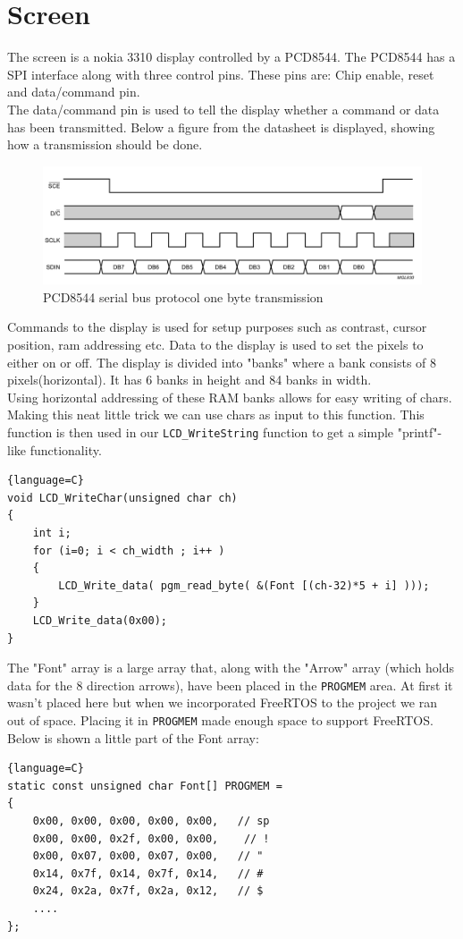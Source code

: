 \section{Screen}
The screen is a nokia 3310 display controlled by a PCD8544. The PCD8544 has a SPI interface along with three control pins. These pins are: Chip enable, reset and data/command pin.\\
The data/command pin is used to tell the display whether a command or data has been transmitted. Below a figure from the datasheet is displayed, showing how a transmission should be done.

\begin{figure}[H]
\centering
\includegraphics[width=.8\textwidth]{billeder/Display_protocol}
\caption{PCD8544 serial bus protocol one byte transmission}
\end{figure}

Commands to the display is used for setup purposes such as contrast, cursor position, ram addressing etc. Data to the display is used to set the pixels to either on or off. The display is divided into "banks" where a bank consists of 8 pixels(horizontal). It has 6 banks in height and 84 banks in width.\\
Using horizontal addressing of these RAM banks allows for easy writing of chars. Making this neat little trick we can use chars as input to this function. This function is then used in our \texttt{LCD\_WriteString}  function to get a simple "printf"-like functionality.
\begin{lstlisting}{language=C}
void LCD_WriteChar(unsigned char ch)
{
	int i;
	for (i=0; i < ch_width ; i++ )
	{
		LCD_Write_data( pgm_read_byte( &(Font [(ch-32)*5 + i] )));	
	}
	LCD_Write_data(0x00);			
}
\end{lstlisting}
The "Font" array is a large array that, along with the "Arrow" array (which holds data for the 8 direction arrows), have been placed in the \texttt{PROGMEM} area. At first it wasn't placed here but when we incorporated FreeRTOS to the project we ran out of space. Placing it in \texttt{PROGMEM} made enough space to support FreeRTOS.\\
Below is shown a little part of the Font array:
\begin{lstlisting}{language=C}
static const unsigned char Font[] PROGMEM =
{
	0x00, 0x00, 0x00, 0x00, 0x00,   // sp 
	0x00, 0x00, 0x2f, 0x00, 0x00,    // ! 
	0x00, 0x07, 0x00, 0x07, 0x00,   // "  
	0x14, 0x7f, 0x14, 0x7f, 0x14,   // #  
	0x24, 0x2a, 0x7f, 0x2a, 0x12,   // $  
	....  
};
\end{lstlisting}


